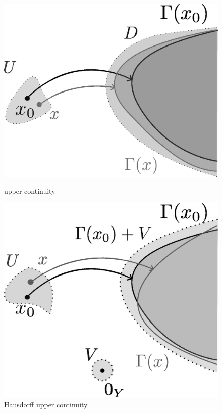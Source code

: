 \documentclass[a4paper,11pt]{jsarticle}
\theoremstyle{definition}
\begin{document}
\begin{figure}[htb]
  \mbox{}
  \hfill
  \begin{minipage}[b]{0.45\linewidth}
    \centering
    \includegraphics[keepaspectratio, scale=0.1]{figures/continuities/monochrome_upper_continuity.eps}
    \caption{upper continuity}
  \end{minipage}
  \hfill
  \begin{minipage}[b]{0.45\linewidth}
    \centering
    \includegraphics[keepaspectratio, scale=0.1]{figures/continuities/monochrome_h_upper_continuity.eps}
    \caption{Hausdorff upper continuity}
  \end{minipage}
  \hfill
  \mbox{}
\end{figure}
\end{document}
